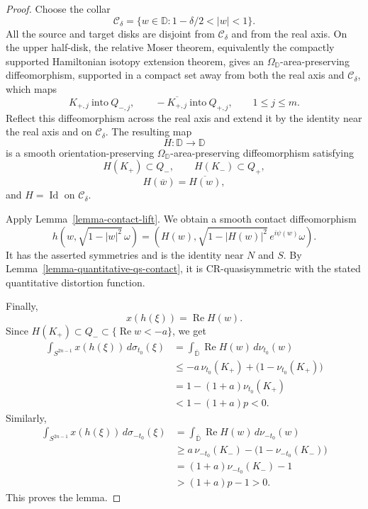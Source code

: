 \documentclass[11pt]{article}
\theoremstyle{definition}
\theoremstyle{remark}
\theoremstyle{definition}
\newcommand{\D}{\mathbb D}
\newcommand{\Id}{\operatorname{Id}}
\begin{document}
\begin{proof}
Choose the collar
\[
        \mathcal C_\delta=\{w\in\D:1-\delta/2<|w|<1\}.
\]
All the source and target disks are disjoint from \(\mathcal C_\delta\) and
from the real axis.  On the upper half-disk, the relative Moser theorem,
equivalently the compactly supported Hamiltonian isotopy extension theorem,
gives an \(\Omega_{\D}\)-area-preserving diffeomorphism, supported in a
compact set away from both the real axis and \(\mathcal C_\delta\), which
maps
\[
        K_{+,j}\ \text{into}\ Q_{-,j},
        \qquad
        -\overline{K_{+,j}}\ \text{into}\ Q_{+,j},
        \qquad 1\le j\le m.
\]
Reflect this diffeomorphism across the real axis and extend it by the identity
near the real axis and on \(\mathcal C_\delta\).  The resulting map
\[
        H:\D\to\D
\]
is a smooth orientation-preserving \(\Omega_{\D}\)-area-preserving
diffeomorphism satisfying
\[
        H(K_+)\subset Q_-,
        \qquad
        H(K_-)\subset Q_+,
\]
\[
        H(\overline w)=\overline{H(w)},
\]
and \(H=\Id\) on \(\mathcal C_\delta\).

Apply Lemma~\ref{lemma-contact-lift}.  We obtain a smooth contact
diffeomorphism
\[
        h(w,\sqrt{1-|w|^2}\,\omega)
        =
        \left(
        H(w),
        \sqrt{1-|H(w)|^2}\,e^{i\psi(w)}\omega
        \right).
\]
It has the asserted symmetries and is the identity near \(N\) and \(S\).
By Lemma~\ref{lemma-quantitative-qs-contact}, it is CR-quasisymmetric with the
stated quantitative distortion function.

Finally,
\[
        x(h(\xi))=\operatorname{Re}H(w).
\]
Since \(H(K_+)\subset Q_-\subset\{\operatorname{Re}w<-a\}\), we get
\[
\begin{aligned}
        \int_{S^{2n-1}}x(h(\xi))\,d\sigma_{t_0}(\xi)
        &=
        \int_{\overline{\D}}\operatorname{Re}H(w)\,d\nu_{t_0}(w)  \\
        &\le
        -a\,\nu_{t_0}(K_+)
        +
        \bigl(1-\nu_{t_0}(K_+)\bigr)  \\
        &=
        1-(1+a)\nu_{t_0}(K_+)  \\
        &<
        1-(1+a)p
        <
        0.
\end{aligned}
\]
Similarly,
\[
\begin{aligned}
        \int_{S^{2n-1}}x(h(\xi))\,d\sigma_{-t_0}(\xi)
        &=
        \int_{\overline{\D}}\operatorname{Re}H(w)\,d\nu_{-t_0}(w)  \\
        &\ge
        a\,\nu_{-t_0}(K_-)
        -
        \bigl(1-\nu_{-t_0}(K_-)\bigr)  \\
        &=
        (1+a)\nu_{-t_0}(K_-)-1  \\
        &>
        (1+a)p-1
        >
        0.
\end{aligned}
\]
This proves the lemma.
\end{proof}
\end{document}
